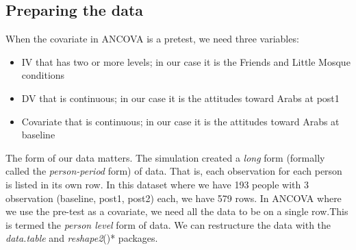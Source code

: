 \documentclass[
  11pt,
]{book}
\providecommand{\tightlist}{%
  \setlength{\itemsep}{0pt}\setlength{\parskip}{0pt}}
\begin{document}
\hypertarget{preparing-the-data}{%
\subsection{Preparing the data}\label{preparing-the-data}}

When the covariate in ANCOVA is a pretest, we need three variables:

\begin{itemize}
\tightlist
\item
  IV that has two or more levels; in our case it is the Friends and Little Mosque conditions
\item
  DV that is continuous; in our case it is the attitudes toward Arabs at post1
\item
  Covariate that is continuous; in our case it is the attitudes toward Arabs at baseline
\end{itemize}

The form of our data matters. The simulation created a \emph{long} form (formally called the \emph{person-period} form) of data. That is, each observation for each person is listed in its own row. In this dataset where we have 193 people with 3 observation (baseline, post1, post2) each, we have 579 rows. In ANCOVA where we use the pre-test as a covariate, we need all the data to be on a single row.This is termed the \emph{person level} form of data. We can restructure the data with the \emph{data.table} and \emph{reshape2}()* packages.
\end{document}
